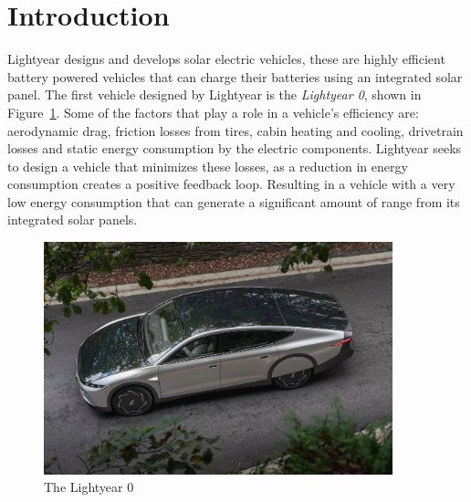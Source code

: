 \section{Introduction}
\label{sec:introduction}
Lightyear designs and develops solar electric vehicles, these are highly efficient battery powered vehicles that can charge their batteries using an integrated solar panel. The first vehicle designed by Lightyear is the \textit{Lightyear 0}, shown in Figure~\ref{fig:zero}. Some of the factors that play a role in a vehicle's efficiency are: aerodynamic drag, friction losses from tires, cabin heating and cooling, drivetrain losses and static energy consumption by the electric components. Lightyear seeks to design a vehicle that minimizes these losses, as a reduction in energy consumption creates a positive feedback loop. Resulting in a vehicle with a very low energy consumption that can generate a significant amount of range from its integrated solar panels.

\begin{figure}[htb]
    \centering
    \includegraphics[width=0.9\textwidth]{images/Lightyear_zero.jpg}
    \caption{The Lightyear 0}
    \label{fig:zero}
\end{figure}

